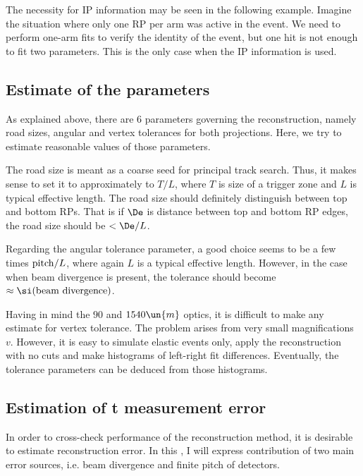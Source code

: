 The necessity for IP information may be seen in the following example. Imagine the situation where only one RP per arm was active in the event. We need to perform one-arm fits to verify the identity of the event, but one hit is not enough to fit two parameters. This is the only case when the IP information is used.

\subsection[estim]{Estimate of the parameters}

As explained above, there are 6 parameters governing the reconstruction, namely road sizes, angular and vertex tolerances for both projections. Here, we try to estimate reasonable values of those parameters.

The road size is meant as a coarse seed for principal track search. Thus, it makes sense to set it to approximately to $T/L$, where $T$ is size of a trigger zone and $L$ is typical effective length. The road size should definitely distinguish between top and bottom RPs. That is if $\De$ is distance between top and bottom RP edges, the road size should be $< \De / L$.

Regarding the angular tolerance parameter, a good choice seems to be a few times ${\rm pitch}/L$, where again $L$ is a typical effective length. However, in the case when beam divergence is present, the tolerance should become $\approx \si({\rm beam\ divergence})$.

Having in mind the $90$ and $1540\un{m}$ optics, it is difficult to make any estimate for vertex tolerance. The problem arises from very small magnifications $v$. However, it is easy to simulate elastic events only, apply the reconstruction with no cuts and make histograms of left-right fit differences. Eventually, the tolerance parameters can be deduced from those histograms.

\subsection{Estimation of t measurement error}

In order to cross-check performance of the reconstruction method, it is desirable to estimate reconstruction error. In this , I will express contribution of two main error sources, i.e. beam divergence and finite pitch of detectors.

